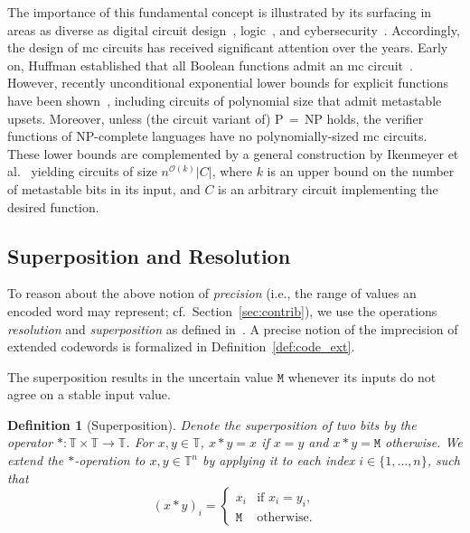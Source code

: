 \documentclass[9pt,journal,compsoc]{IEEEtran}
\newtheorem{definition}[theorem]{Definition}
\theoremstyle{remark}
\newcommand{\mfu}{\mathtt{M}}
\newcommand{\IT}{\mathbb{T}}
\newcommand{\BO}{\mathcal{O}}
\begin{document}
The importance of this fundamental concept is illustrated by its surfacing in
areas as diverse as digital circuit
design~\cite{caldwell58circuits,friedrichs18containing,huffman57design},
logic~\cite{kleene52meta,korner66experience}, and
cybersecurity~\cite{hu12complexity,tiwari09flow}. Accordingly, the design of
mc circuits has received significant attention over the years. Early
on, Huffman established that all Boolean functions admit an mc
circuit~\cite{huffman57design}. However, recently unconditional exponential
lower bounds for explicit functions have been
shown~\cite{ikenmeyer18complexity}, including 
circuits of polynomial size that admit metastable upsets. Moreover, unless (the circuit variant of)
P$\,=\,$NP holds, the verifier functions of NP-complete languages have no
polynomially-sized mc circuits. These lower bounds are complemented by
a general construction by Ikenmeyer et al.~\cite{ikenmeyer18complexity} yielding circuits of size $n^{\BO(k)}|C|$, where $k$ is an upper 
bound on the number of metastable bits in its input,  and $C$ is an arbitrary circuit implementing the desired function.

\subsection{Superposition and Resolution}
To reason about the above notion of \emph{precision} (i.e., the range of values an encoded word may represent; cf.\ Section~\ref{sec:contrib}), we use the operations \emph{resolution} and \emph{superposition} as defined in~\cite{friedrichs18containing}. A precise notion of the imprecision of extended codewords
is formalized in Definition~\ref{def:code_ext}.

The superposition results in the uncertain value $\mfu$ whenever its inputs do not agree on a stable input value.

\begin{definition}[Superposition]\label{def:superposition}
Denote the \emph{superposition} of two bits by the operator $*\colon\IT \times \IT\rightarrow\IT$.
For $x,y\in \IT$, $x*y=x$ if $x=y$ and $x*y=\mfu$ otherwise. We extend the
$*$-operation to $x,y\in \IT^n$ by applying it to each index $i\in\{1,\ldots,n\}$, such that
\[ (x*y)_i = \begin{cases} x_i &\text{if } x_i=y_i,\\\mfu &\text{otherwise.} \end{cases}\]
\end{definition}
\end{document}
